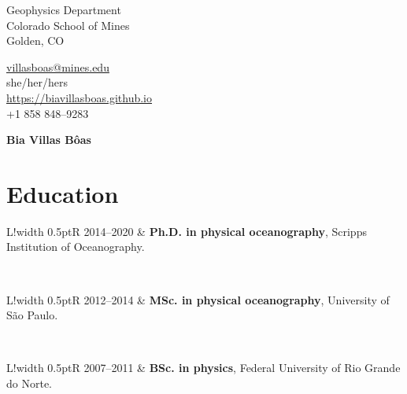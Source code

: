 \documentclass[10pt]{article}
\newcommand\VRule{\color{lightgray}\vrule width 0.5pt}
\begin{document}
\pagestyle{empty}
\begin{minipage}[ht]{0.48\textwidth}
\begin{flushleft}
\small{Geophysics Department}\\
\small{Colorado School of Mines}\\
\small{Golden, CO} \\
\end{flushleft}
\end{minipage}
\hfill
\begin{minipage}[ht]{0.35\textwidth}
\begin{flushleft}
\noindent \href{mailto:villasboas@mines.edu}{villasboas@mines.edu}  \\
she/her/hers  \\
{\url{https://biavillasboas.github.io} } \\
\small{+1 858 848--9283}  \\
\end{flushleft}
\end{minipage}


\vspace{.5cm}
\begin{center}
	{\bfseries\Huge Bia Villas B\^{o}as}
\end{center}
\vspace{.5cm}

\section*{Education}
\vspace{.3cm}
\begin{tabular}{L!{\VRule}R}
\textsc{2014--2020} & \textbf{Ph.D. in physical oceanography}, Scripps Institution of Oceanography. \\ 
\end{tabular}
\\[10pt]
\begin{tabular}{L!{\VRule}R}
	\textsc{2012--2014} & \textbf{MSc. in physical oceanography}, University of S\~{a}o Paulo. \\ 
\end{tabular}
\\[10pt]
\begin{tabular}{L!{\VRule}R}
\textsc{2007--2011} & \textbf{BSc. in physics}, Federal University of Rio Grande do Norte. \\
\end{tabular}

\end{document}
